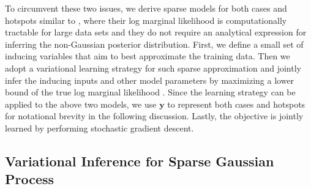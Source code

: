 \documentclass[journal]{IEEEtran}
\begin{document}
To circumvent these two issues, we derive sparse models for both cases and hotspots similar to \cite{titsias2009variational, hensman2013gaussian, hensman2015scalable}, where their log marginal likelihood is computationally tractable for large data sets and they do not require an analytical expression for inferring the non-Gaussian posterior distribution. First, we define a small set of inducing variables that aim to best approximate the training data. Then we adopt a variational learning strategy for such sparse approximation and jointly infer the inducing inputs and other model parameters by maximizing a lower bound of the true log marginal likelihood \cite{titsias2009variational, hensman2015scalable}.
Since the learning strategy can be applied to the above two models, we use $\mathbf{y}$ to represent both cases and hotspots for notational brevity in the following discussion.
Lastly, the objective is jointly learned by performing stochastic gradient descent.


\subsection{Variational Inference for Sparse Gaussian Process}
\label{sec:variational-inference}
\end{document}
